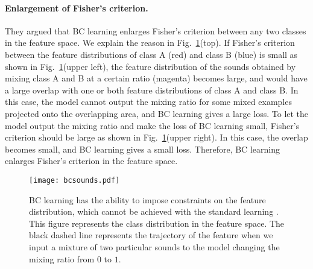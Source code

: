 \documentclass[10pt,twocolumn,letterpaper]{article}
\begin{document}
\paragraph{Enlargement of Fisher's criterion.}\label{fisher}
They argued that BC learning enlarges Fisher's criterion \cite{fisher1936use} between any two classes in the feature space. We explain the reason in Fig.~\ref{fig:bcsounds}(top). If Fisher's criterion between the feature distributions of class A (red) and class B (blue) is small as shown in Fig.~\ref{fig:bcsounds}(upper left), the feature distribution of the sounds obtained by mixing class A and B at a certain ratio (magenta) becomes large, and would have a large overlap with one or both feature distributions of class A and class B. In this case, the model cannot output the mixing ratio for some mixed examples projected onto the overlapping area, and BC learning gives a large loss. To let the model output the mixing ratio and make the loss of BC learning small, Fisher's criterion should be large as shown in Fig.~\ref{fig:bcsounds}(upper right). In this case, the overlap becomes small, and BC learning gives a small loss. Therefore, BC learning enlarges Fisher's criterion in the feature space.

\begin{figure}
	\centering
	\texttt{[image: bcsounds.pdf]}
	\vspace{2mm}
	\caption{BC learning has the ability to impose constraints on the feature distribution, which cannot be achieved with the standard learning \cite{tokozume2018learning}. This figure represents the class distribution in the feature space. The black dashed line represents the trajectory of the feature when we input a mixture of two particular sounds to the model changing the mixing ratio from $0$ to $1$.}
	\label{fig:bcsounds}
	\vspace{-2mm}
\end{figure}
\end{document}
